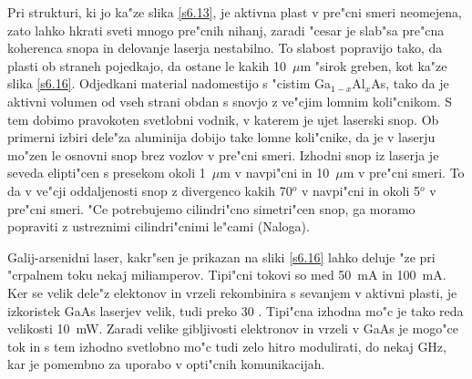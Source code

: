 Pri strukturi, ki jo ka"ze slika \ref{s6.13}, je aktivna plast v pre"cni
smeri neomejena, zato lahko hkrati sveti mnogo pre"cnih nihanj, zaradi
"cesar je slab"sa pre"cna koherenca snopa in delovanje laserja nestabilno.
To slabost popravijo tako, da plasti ob straneh pojedkajo, da ostane le
kakih 10~$\mu$m "sirok greben, kot ka"ze slika \ref{s6.16}. Odjedkani
material nadomestijo s "cistim Ga$_{1-x}$Al$_x$As, tako da je aktivni
volumen od vseh strani obdan s snovjo z ve"cjim lomnim koli"cnikom. S tem
dobimo pravokoten svetlobni vodnik, v katerem je ujet laserski snop. Ob
primerni izbiri dele"za aluminija dobijo take lomne koli"cnike, da je v
laserju mo"zen le osnovni snop brez vozlov v pre"cni smeri. Izhodni snop iz
laserja je seveda elipti"cen s presekom okoli 1~$\mu$m v navpi"cni in 10~$\mu
$m v pre"cni smeri. To da v ve"cji oddaljenosti snop z divergenco kakih 70$^o
$ v navpi"cni in okoli 5$^o$ v pre"cni smeri. "Ce potrebujemo cilindri"cno
simetri"cen snop, ga moramo popraviti z ustreznimi cilindri"cnimi le"cami
(Naloga).

Galij-arsenidni laser, kakr"sen je prikazan na sliki \ref{s6.16} lahko
deluje "ze pri "crpalnem toku nekaj miliamperov. Tipi"cni tokovi so med
50~mA in 100~mA. Ker se velik dele"z elektonov in vrzeli rekombinira s
sevanjem v aktivni plasti, je izkoristek GaAs laserjev velik, tudi preko 30
. Tipi"cna izhodna mo"c je tako reda velikosti
10~mW. Zaradi velike gibljivosti elektronov in vrzeli v GaAs je mogo"ce tok
in s tem izhodno svetlobno mo"c tudi zelo hitro modulirati, do nekaj GHz,
kar je pomembno za uporabo v opti"cnih komunikacijah.
